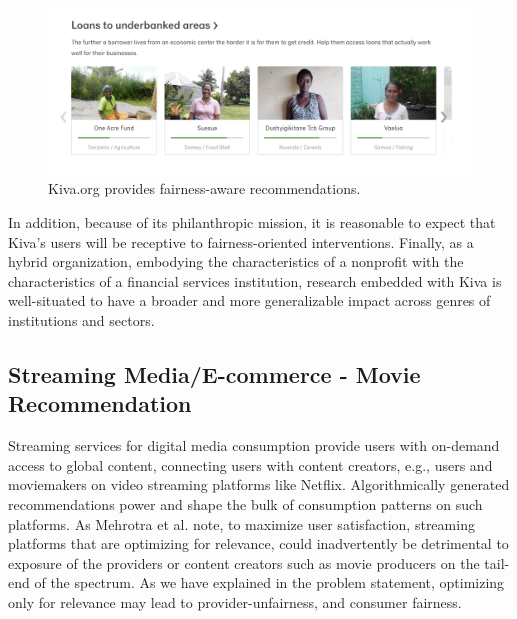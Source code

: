     
    \begin{figure}[htb]
    \includegraphics[width=0.98\columnwidth]{imgs/far/underbanked_areas.png}
    \caption{Kiva.org provides fairness-aware recommendations.}
    \label{fig:kiva_underbanked}
    \end{figure}
    
    In addition, because of its philanthropic mission, it is reasonable to expect that Kiva's users will be receptive to fairness-oriented interventions. Finally, as a hybrid organization, embodying the characteristics of a nonprofit with the characteristics of a financial services institution, research embedded with Kiva is well-situated to have a broader and more generalizable impact across genres of institutions and sectors.

    

    \subsection{Streaming Media/E-commerce - Movie Recommendation}

    Streaming services for digital media consumption provide users with on-demand access to global content, connecting users with content creators, e.g., users and moviemakers on video streaming platforms like Netflix. Algorithmically generated recommendations power and shape the bulk of consumption patterns on such platforms. As Mehrotra et al. \cite{Mehrotra2018Towards} note, to maximize user satisfaction, streaming platforms that are optimizing for relevance, could inadvertently be detrimental to exposure of the providers or content creators such as movie producers on the tail-end of the spectrum. As we have explained in the problem statement, optimizing only for relevance may lead to provider-unfairness, and consumer fairness.
    
